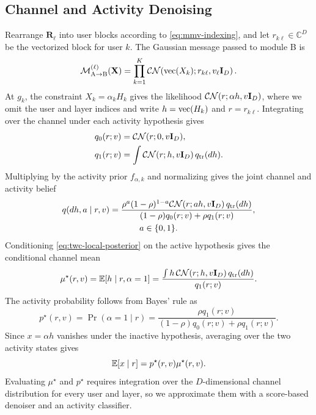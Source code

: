 \subsection{Channel and Activity Denoising}

Rearrange $\mathbf R_\ell$ into user blocks according to
\eqref{eq:mmv-indexing}, and let $r_{k\ell}\in\mathbb C^D$ be the
vectorized block for user $k$. The Gaussian message passed to module B
is
\begin{equation}
 \mathcal M_{\rm A\to B}^{(\ell)}(\mathbf X)
 =\prod_{k=1}^{K}\mathcal{CN}\!\left(\operatorname{vec}(X_k);
                       r_{k\ell},v_\ell\mathbf{I}_D\right).
 \label{eq:twc-denoiser-message}
\end{equation}
At $g_k$, the constraint $X_k=\alpha_kH_k$ gives the likelihood
$\mathcal{CN}(r;\alpha h,v\mathbf{I}_D)$, where we omit the user and layer indices
and write $h=\operatorname{vec}(H_k)$ and $r=r_{k\ell}$. Integrating over the
channel under each activity hypothesis gives
\begin{equation}
 \begin{aligned}
 q_0(r;v)&=\mathcal{CN}(r;0,v\mathbf{I}_D),\\
 q_1(r;v)&=\int\mathcal{CN}(r;h,v\mathbf{I}_D)\,q_{\rm tr}(dh).
 \end{aligned}
 \label{eq:twc-local-densities}
\end{equation}
Multiplying by the activity prior $f_{\alpha,k}$ and normalizing
gives the joint channel and activity belief
\begin{equation}
 \begin{gathered}
 q(dh,a\mid r,v)=
 \frac{\rho^a(1-\rho)^{1-a}\mathcal{CN}(r;ah,v\mathbf{I}_D)\,q_{\rm tr}(dh)}
 {(1-\rho)q_0(r;v)+\rho q_1(r;v)},\\
 a\in\{0,1\}.
 \end{gathered}
 \label{eq:twc-local-posterior}
\end{equation}
Conditioning \eqref{eq:twc-local-posterior} on the active hypothesis
gives the conditional channel mean
\begin{equation}
 \mu^\star(r,v)=\mathbb{E}[h\mid r,\alpha=1]
 =\frac{\int h\,\mathcal{CN}(r;h,v\mathbf{I}_D)\,q_{\rm tr}(dh)}{q_1(r;v)}.
 \label{eq:twc-local-channel-target}
\end{equation}
The activity probability follows from Bayes' rule as
\begin{equation}
 p^\star(r,v)=\Pr(\alpha=1\mid r)
 =\frac{\rho q_1(r;v)}
 {(1-\rho)q_0(r;v)+\rho q_1(r;v)}.
 \label{eq:twc-local-activity-target}
\end{equation}
Since $x=\alpha h$ vanishes under the inactive hypothesis, averaging
over the two activity states gives \cite{cai2026}
\begin{equation}
 \mathbb{E}[x\mid r]=p^\star(r,v)\mu^\star(r,v).
 \label{eq:twc-mixture-mean}
\end{equation}
Evaluating $\mu^\star$ and $p^\star$ requires integration over the
$D$-dimensional channel distribution for every user and layer, so we
approximate them with a score-based denoiser and an activity classifier.

